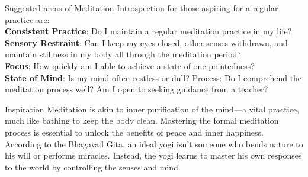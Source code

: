 \newpage
\begin{mananam}{}
\mananamtext
Suggested areas of Meditation Introspection for those aspiring for a regular practice are:\\
\textbf{Consistent Practice}: Do I maintain a regular meditation practice in my life?\\
\textbf{Sensory Restraint}: Can I keep my eyes closed, other senses withdrawn, and maintain stillness in my body all through the meditation period?\\
\textbf{Focus}: How quickly am I able to achieve a state of one-pointedness?\\
\textbf{State of Mind}: Is my mind often restless or dull?
Process: Do I comprehend the meditation process well? Am I open to seeking guidance from a teacher?
\end{mananam}
\WritingHand{}
\begin{inspiration}{\mananamfont Inspiration}
\mananamtext Meditation is akin to inner purification of the mind—a vital practice, much like bathing to keep the body clean. Mastering the formal meditation process is essential to unlock the benefits of peace and inner happiness.\\
According to the Bhagavad Gita, an ideal yogi isn’t someone who bends nature to his will or performs miracles. Instead, the yogi learns to master his own responses to the world by controlling the senses and mind.
\end{inspiration}
\newpage



